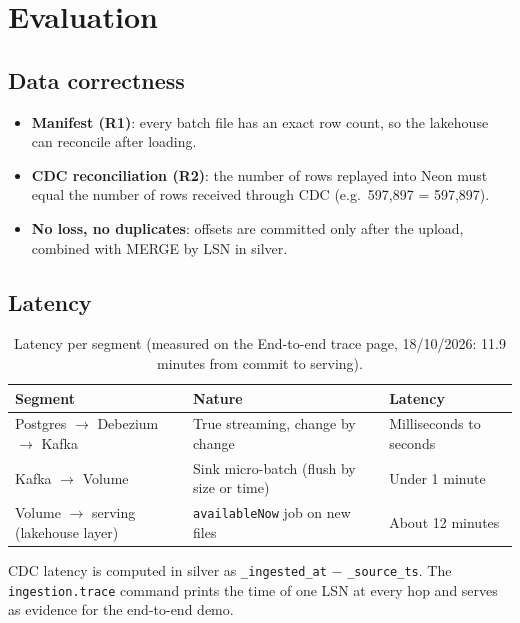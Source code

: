 \documentclass[12pt,a4paper]{article}
\newcommand{\code}[1]{\texttt{#1}}
\begin{document}
\section{Evaluation}

\subsection{Data correctness}
\begin{itemize}
  \item \textbf{Manifest (R1)}: every batch file has an exact row count, so the lakehouse can reconcile after loading.
  \item \textbf{CDC reconciliation (R2)}: the number of rows replayed into Neon must equal the number of rows received
        through CDC (e.g.\ 597,897 = 597,897).
  \item \textbf{No loss, no duplicates}: offsets are committed only after the upload, combined with MERGE by LSN in
        silver.
\end{itemize}

\subsection{Latency}
\begin{table}[H]
\centering\small
\begin{tabularx}{\textwidth}{@{}lXl@{}}
\toprule
Segment & Nature & Latency \\
\midrule
Postgres $\rightarrow$ Debezium $\rightarrow$ Kafka & True streaming, change by change & Milliseconds to seconds \\
Kafka $\rightarrow$ Volume & Sink micro-batch (flush by size or time) & Under 1 minute \\
Volume $\rightarrow$ serving (lakehouse layer) & \code{availableNow} job on new files & About 12 minutes \\
\bottomrule
\end{tabularx}
\caption{Latency per segment (measured on the End-to-end trace page, 18/10/2026: 11.9 minutes from commit to serving).}
\end{table}

CDC latency is computed in silver as \code{\_ingested\_at} $-$ \code{\_source\_ts}. The \code{ingestion.trace} command
prints the time of one LSN at every hop and serves as evidence for the end-to-end demo.
\end{document}
